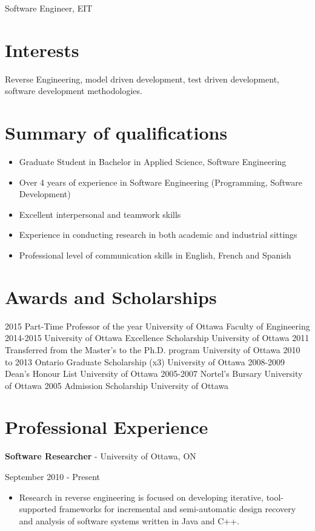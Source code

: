 \documentclass[]{friggeri-cv}
\begin{document}
       {Software Engineer, EIT}

\section{Interests}
Reverse Engineering, model driven development, test driven development, software development methodologies.

\section{Summary of qualifications}

\begin{itemize}
\item Graduate Student in Bachelor in Applied Science, Software Engineering
\item Over 4 years of experience in Software Engineering (Programming, Software Development)
\item Excellent interpersonal and teamwork skills
\item Experience in conducting research in both academic and industrial sittings
\item Professional level of communication skills in English, French and Spanish
\end{itemize}

\section{Awards and Scholarships}
\begin{entrylist}
  \entry
    {2015}
    {Part-Time Professor of the year}
    {University of Ottawa}
    {Faculty of Engineering}
 \entry
    {2014-2015}
    {University of Ottawa Excellence Scholarship}
    {University of Ottawa}
    {}
 \entry
    {2011}
    {Transferred from the Master's to the Ph.D. program}
    {University of Ottawa}
    {}
     \entry
    {2010 to 2013}
    {Ontario Graduate Scholarship (x3)}
    {University of Ottawa}
    {}
    \entry
    {2008-2009}
    {Dean’s Honour List}
    {University of Ottawa}
    {}
    \entry
    {2005-2007}
    {Nortel’s Bursary}
    {University of Ottawa}
    {}
    \entry
    {2005}
    {Admission Scholarship}
    {University of Ottawa}
    {}
\end{entrylist}

\section{Professional Experience}
\textbf{Software Researcher} - 
University of Ottawa, ON
\begin{flushright}  
September 2010 - Present \\
\end{flushright}   
\begin{itemize}
\item Research in reverse engineering is focused on developing iterative, tool-supported frameworks for incremental and semi-automatic design recovery and analysis of software systems written in Java and C++. 
\end{itemize}
\end{document}
